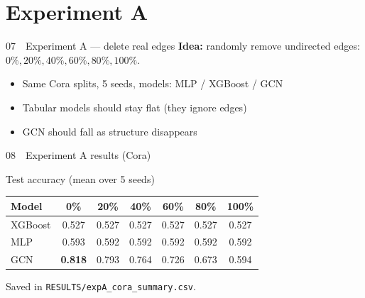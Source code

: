 \documentclass[
  english,
  aspectratio=169,
]{beamer}
\begin{document}
\section{Experiment A}

\begin{frame}{07~~Experiment A --- delete real edges}
  \textbf{Idea:} randomly remove undirected edges:
  $0\%, 20\%, 40\%, 60\%, 80\%, 100\%$.

  \begin{itemize}
    \item Same Cora splits, 5 seeds, models: MLP / XGBoost / GCN
    \item Tabular models should stay flat (they ignore edges)
    \item GCN should fall as structure disappears
  \end{itemize}
\end{frame}

\begin{frame}{08~~Experiment A results (Cora)}
  \begin{block}{Test accuracy (mean over 5 seeds)}
    \scriptsize
    \renewcommand{\arraystretch}{1.15}
    \begin{tabular}{lcccccc}
      \textbf{Model} & 0\% & 20\% & 40\% & 60\% & 80\% & 100\% \\
      \hline
      XGBoost & 0.527 & 0.527 & 0.527 & 0.527 & 0.527 & 0.527 \\
      MLP & 0.593 & 0.592 & 0.592 & 0.592 & 0.592 & 0.592 \\
      GCN & \textbf{0.818} & 0.793 & 0.764 & 0.726 & 0.673 & 0.594 \\
    \end{tabular}
  \end{block}

  \vspace{0.45em}
  {\small Saved in \texttt{RESULTS/expA\_cora\_summary.csv}.}
\end{frame}
\end{document}
